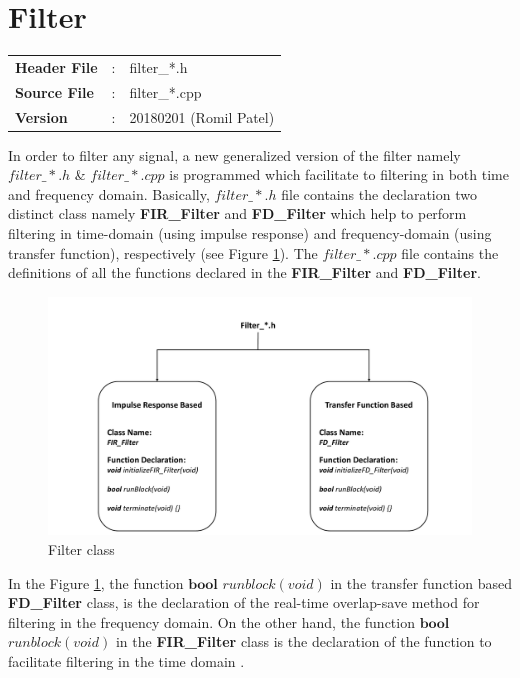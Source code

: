 \section{Filter}
\begin{refsection}
\begin{tcolorbox}	
	\begin{tabular}{p{2.75cm} p{0.2cm} p{10.5cm}}
		\textbf{Header File}   &:& filter\_*.h \\
		\textbf{Source File}   &:& filter\_*.cpp \\
		\textbf{Version}       &:& 20180201 (Romil Patel)
	\end{tabular}
\end{tcolorbox}
In order to filter any signal, a new generalized version of the filter namely $filter\_*.h$ \& $filter\_*.cpp$ is programmed which facilitate to filtering in both time and frequency domain. Basically, $filter\_*.h$ file contains the declaration two distinct class namely \textbf{FIR\_Filter} and \textbf{FD\_Filter} which help to perform filtering in time-domain (using impulse response) and frequency-domain (using transfer function), respectively (see Figure \ref{FilterClass}). The $filter\_*.cpp$ file contains the definitions of all the functions declared in the  \textbf{FIR\_Filter} and \textbf{FD\_Filter}.\\
\begin{figure}[h]
	\centering
	\includegraphics[width=16cm]{./algorithms/filter/figures/Filter_class.pdf}
	\caption{Filter class}
	\label{FilterClass}
\end{figure}
In the Figure \ref{FilterClass}, the function $\textbf{bool}$ $runblock(void)$ in the transfer function based \textbf{FD\_Filter} class, is the declaration of the real-time overlap-save method for filtering in the frequency domain. On the other hand, the function  $\textbf{bool}$ $runblock(void)$ in the \textbf{FIR\_Filter} class is the declaration of the function to facilitate filtering in the time domain \cite{Kuo,Rappaport2002} .\\

\end{refsection}
